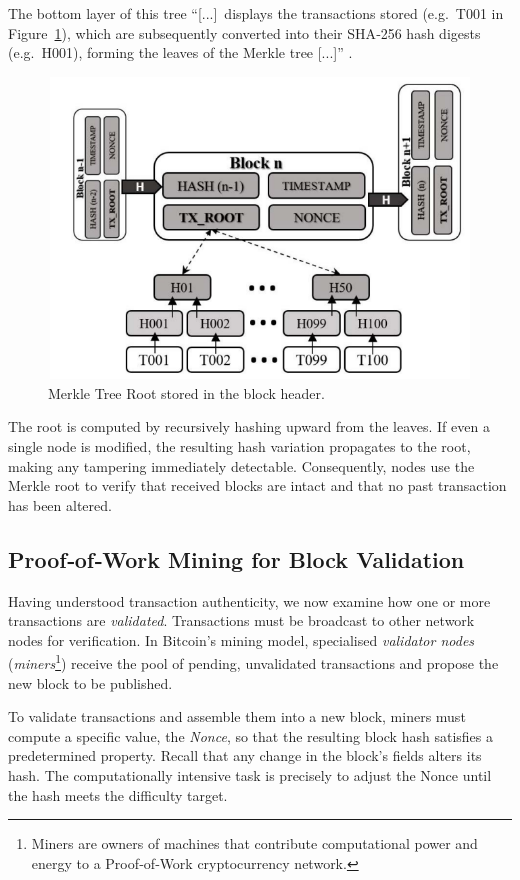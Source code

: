 The bottom layer of this tree “[...]~displays the transactions stored (e.g.~T001 in Figure~\ref{merkle_root_img}), which are subsequently converted into their SHA‑256 hash digests (e.g.~H001), forming the leaves of the Merkle tree [...]” \cite{merkle_tree}.
\begin{figure}[h]
    \centering
    \includegraphics[width=12cm,height=8cm]{Images/Chap1/Merkle_Tree.png}
    \caption[Merkle Tree Root]{Merkle Tree Root stored in the block header.}
    \label{merkle_root_img}
\end{figure}
The root is computed by recursively hashing upward from the leaves. If even a single node is modified, the resulting hash variation propagates to the root, making any tampering immediately detectable. Consequently, nodes use the Merkle root to verify that received blocks are intact and that no past transaction has been altered.

\subsection{Proof‑of‑Work Mining for Block Validation}\label{pow}
Having understood transaction authenticity, we now examine how one or more transactions are \textit{validated}. Transactions must be broadcast to other network nodes for verification. In Bitcoin's mining model, specialised \textit{validator nodes} (\textit{miners}\footnote{Miners are owners of machines that contribute computational power and energy to a Proof‑of‑Work cryptocurrency network.}) receive the pool of pending, unvalidated transactions and propose the new block to be published.

To validate transactions and assemble them into a new block, miners must compute a specific value, the \textit{Nonce}, so that the resulting block hash satisfies a predetermined property. Recall that any change in the block's fields alters its hash. The computationally intensive task is precisely to adjust the Nonce until the hash meets the difficulty target.

